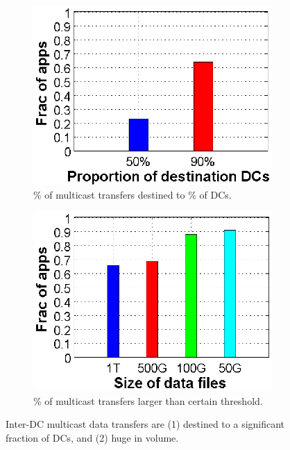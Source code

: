 \begin{figure}[t]
        \centering
        \begin{subfigure}[b]{0.23\textwidth}
                \centering
                \includegraphics[width=\textwidth]{images/destinationDC.eps}
                \caption{\% of multicast transfers destined to \% of DCs.}
                \label{fig:bulk:dest}
        \end{subfigure}
	\hspace{0.1cm}
        \begin{subfigure}[b]{0.23\textwidth}
                \centering
                \includegraphics[width=\textwidth]{images/DataSize.eps}
                \caption{\% of multicast transfers larger than certain threshold.}
                \label{fig:bulk:size}
        \end{subfigure}
        \caption{Inter-DC multicast data transfers are (1) destined to a significant
fraction of DCs, and (2) huge in volume. }
        \label{fig:bulk}
\vspace{-0.4cm}
\end{figure}

